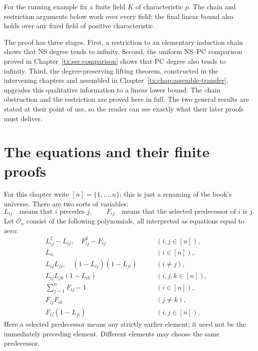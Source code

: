 \documentclass[11pt,a4paper,oneside,openany]{book}
\theoremstyle{definition}\newtheorem{definition}[theorem]{Definition}
\theoremstyle{remark}\newtheorem{remark}[theorem]{Remark}
\numberwithin{equation}{chapter}
\begin{document}
For the running example fix a finite field $K$ of characteristic $p$.
The chain and restriction arguments below work over every field; the
final linear bound also holds over any fixed field of positive characteristic.

The proof has three stages. First, a restriction to an elementary
induction chain shows that NS degree tends to infinity. Second, the
uniform NS--PC comparison proved in Chapter~\ref{tx:sec:comparison}
shows that PC degree also tends to infinity. Third, the degree-preserving
lifting theorem, constructed in the intervening chapters and assembled
in Chapter~\ref{tx:chap:assemble-transfer}, upgrades this qualitative
information to a linear lower bound. The chain obstruction and the
restriction are proved here in full. The two general results are stated
at their point of use, so the reader can see exactly what their later
proofs must deliver.

\section{The equations and their finite proofs}
For this chapter write $[n]=\{1,\ldots,n\}$; this is just a
renaming of the book's universe. There are two sorts of variables:
\[
 L_{ij}\quad\text{means that }i\text{ precedes }j,\qquad
 F_{ij}\quad\text{means that the selected predecessor of }i\text{ is }j.
\]
Let $\mathcal O_n$ consist of the following polynomials, all interpreted
as equations equal to zero:
\begin{subequations}\label{tx:eq:running-order-axioms}
\begin{align}
 L_{ij}^2-L_{ij},\quad F_{ij}^2-F_{ij}
       &\qquad(i,j\in[n]),\label{tx:eq:order-Boolean}\\
 L_{ii}&\qquad(i\in[n]),\label{tx:eq:order-irreflexive}\\
 L_{ij}L_{ji},\quad(1-L_{ij})(1-L_{ji})
       &\qquad(i\ne j),\label{tx:eq:order-total}\\
 L_{ij}L_{jk}(1-L_{ik})
       &\qquad(i,j,k\in[n]),\label{tx:eq:order-transitive}\\
 \sum_{j=1}^nF_{ij}-1
       &\qquad(i\in[n]),\label{tx:eq:order-function-total}\\
 F_{ij}F_{ik}&\qquad(j\ne k),\label{tx:eq:order-function-collision}\\
 F_{ij}(1-L_{ji})&\qquad(i,j\in[n]).\label{tx:eq:order-predecessor}
\end{align}
\end{subequations}
Here a selected predecessor means any strictly earlier element; it
need not be the immediately preceding element. Different elements may
choose the same predecessor.
\end{document}
